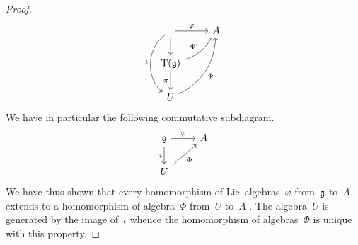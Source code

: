 \begin{proof}
\[\begin{tikzcd}
      \arrow{r}[above]{\varphi}
      \arrow{d}
      \arrow[bend right = 55]{dd}[left]{\iota}
      &
      A
      \\
      \Tensor(\glie)
      \arrow[bend right= 20]{ur}[above left]{\Phi'}
      \arrow{d}[left]{\pi}
      &
      {}
      \\
      U
      \arrow[bend right = 30]{uur}[below right]{\Phi}
      &
      {}
    \end{tikzcd}
  \]
  We have in particular the following commutative subdiagram.
  \[
    \begin{tikzcd}
      \glie
      \arrow{r}[above]{\varphi}
      \arrow{d}[left]{i}
      &
      A
      \\
      U
      \arrow{ur}[below right]{\Phi}
      &
      {}
    \end{tikzcd}
  \]
  We have thus shown that every homomorphism of Lie~algebras~$\varphi$ from~$\mathfrak{g}$ to~$A$ extends to a homomorphism of algebra~$\Phi$ from~$U$ to~$A$ .
  The algebra~$U$ is generated by the image of~$\iota$ whence the homomorphism of algebras~$\Phi$ is unique with this property.
\end{proof}


